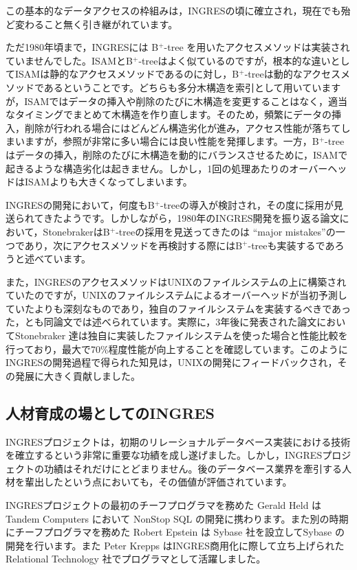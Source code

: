この基本的なデータアクセスの枠組みは，INGRESの頃に確立され，現在でも殆ど変わること無く引き継がれています。


ただ1980年頃まで，INGRESには B$^+$-tree を用いたアクセスメソッドは実装されていませんでした。ISAMとB$^+$-treeはよく似ているのですが，根本的な違いとしてISAMは静的なアクセスメソッドであるのに対し，B$^+$-treeは動的なアクセスメソッドであるということです。どちらも多分木構造を索引として用いていますが，ISAMではデータの挿入や削除のたびに木構造を変更することはなく，適当なタイミングでまとめて木構造を作り直します。そのため，頻繁にデータの挿入，削除が行われる場合にはどんどん構造劣化が進み，アクセス性能が落ちてしまいますが，参照が非常に多い場合には良い性能を発揮します。一方，B$^+$-treeはデータの挿入，削除のたびに木構造を動的にバランスさせるために，ISAMで起きるような構造劣化は起きません。しかし，1回の処理あたりのオーバーヘッドはISAMよりも大きくなってしまいます。


INGRESの開発において，何度もB$^+$-treeの導入が検討され，その度に採用が見送られてきたようです。しかしながら，1980年のINGRES開発を振り返る論文において，StonebrakerはB$^+$-treeの採用を見送ってきたのは ``major mistakes''の一つであり，次にアクセスメソッドを再検討する際にはB$^+$-treeも実装するであろうと述べています。


また，INGRESのアクセスメソッドはUNIXのファイルシステムの上に構築されていたのですが，UNIXのファイルシステムによるオーバーヘッドが当初予測していたよりも深刻なものであり，独自のファイルシステムを実装するべきであった，とも同論文では述べられています。実際に，3年後に発表された論文においてStonebraker 達は独自に実装したファイルシステムを使った場合と性能比較を行っており，最大で70\%程度性能が向上することを確認しています。このようにINGRESの開発過程で得られた知見は，UNIXの開発にフィードバックされ，その発展に大きく貢献しました。


\subsection{人材育成の場としてのINGRES}


INGRESプロジェクトは，初期のリレーショナルデータベース実装における技術を確立するという非常に重要な功績を成し遂げました。しかし，INGRESプロジェクトの功績はそれだけにとどまりません。後のデータベース業界を牽引する人材を輩出したという点においても，その価値が評価されています。


INGRESプロジェクトの最初のチーフプログラマを務めた Gerald Held はTandem Computers において NonStop SQL の開発に携わります。また別の時期にチーフプログラマを務めた Robert Epstein は Sybase 社を設立してSybase の開発を行います。また Peter Krepps はINGRES商用化に際して立ち上げられた Relational Technology 社でプログラマとして活躍しました。


